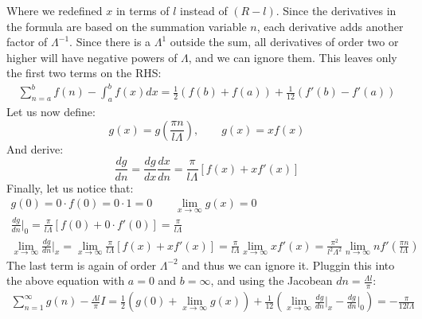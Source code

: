 \documentclass{article}
\begin{document}
Where we redefined $x$ in terms of $l$ instead of $(R - l)$. Since the derivatives in the formula are based on the summation variable $n$, each derivative adds another factor of $\Lambda^{-1}$. Since there is a $\Lambda^1$ outside the sum, all derivatives of order two or higher will have negative powers of $\Lambda$, and we can ignore them. This leaves only the first two terms on the RHS:
\begin{equation}
\begin{gathered}
    \sum_{n=a}^{b} f(n) - \int_{a}^{b}f(x)dx =
    \frac{1}{2}\left(f(b) + f(a)\right) + \frac{1}{12}\left(f'(b) - f'(a)\right)
\end{gathered}
\end{equation}
Let us now define:
\begin{equation}
    g(x) = g\left(\frac{\pi n}{l\Lambda}\right), \qquad g(x) = xf(x)
\end{equation}
And derive:
\begin{equation}
    \frac{dg}{dn} = \frac{dg}{dx}\frac{dx}{dn} = \frac{\pi}{l\Lambda}\left[f(x) + xf'(x)\right]
\end{equation}
Finally, let us notice that:
\begin{equation}
\begin{gathered}
    g(0) = 0 \cdot f(0) = 0 \cdot 1 = 0 \qquad \lim_{x\rightarrow\infty} g(x) = 0
    \\
    \frac{dg}{dn}\Big|_0 = \frac{\pi}{l\Lambda}\left[f(0) + 0 \cdot f'(0)\right] = \frac{\pi}{l\Lambda}
    \\
    \lim_{x\rightarrow\infty} \frac{dg}{dn}\Big|_x =
    \lim_{x\rightarrow\infty} \frac{\pi}{l\Lambda}\left[f(x) + xf'(x)\right] =
    \frac{\pi}{l\Lambda} \lim_{x\rightarrow\infty} xf'(x) =
    \frac{\pi^2}{l^2\Lambda^2} \lim_{n\rightarrow\infty} n{}f'\left(\frac{\pi n}{l\Lambda}\right)
\end{gathered}
\end{equation}
The last term is again of order $\Lambda^{-2}$ and thus we can ignore it. Pluggin this into the above equation with $a = 0$ and $b = \infty$, and using the Jacobean $dn = \frac{\Lambda l}{\pi}$:
\begin{equation}
\begin{gathered}
    \sum_{n=1}^{\infty} g(n) - \frac{\Lambda l}{\pi}I =
    \frac{1}{2}\left(g(0) + \lim_{x\rightarrow\infty}g(x)\right) + \frac{1}{12}\left(\lim_{x\rightarrow\infty}\frac{dg}{dn}\Big|_{x} - \frac{dg}{dn}\Big|_{0}\right) = - \frac{\pi}{12l\Lambda}
\end{gathered}
\end{equation}
\end{document}
